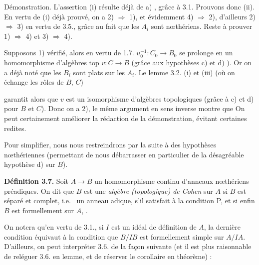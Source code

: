 \documentclass[11pt,a4paper]{article}
\begin{document}
Démonstration. L'assertion (i) résulte déjà de a) , grâce à 3.1. Prouvons donc
(ii). En vertu de (i) déjà prouvé, on a 2) $\Rightarrow$ 1), et évidemment
4) $\Rightarrow$ 2), d'ailleurs 2) $\Rightarrow$ 3) en vertu de 3.5., grâce
au fait que les $A_i$ sont nœthériens. Reste à prouver 1) $\Rightarrow$ 4) et
3) $\Rightarrow$ 4).

Supposons 1) vérifié, alors en vertu de 1.7. $u_0^{-1} : C_0 \to B_0$ se
prolonge en un homomorphisme d'algèbres top $v : C \to B$ (grâce aux
hypothèses c) et d) ). Or on a déjà noté que les $B_i$ sont plats sur les
$A_i$. Le lemme 3.2. (i) et (iii) (où on échange les rôles de $B$, $C$)


garantit alors que $v$ est un isomorphisme d'algèbres topologiques (grâce à c)
et d) pour $B$ et $C$). Donc  on a 2), 
 le même argument en sens inverse montre que 
On peut certainement améliorer la rédaction de la démonstration, évitant
certaines redites.

Pour simplifier, nous nous restreindrons par la suite à des hypothèses
nœthériennes (permettant de nous débarrasser en particulier de la désagréable
hypothèse d) sur $B$).

\textbf{Définition 3.7.} Soit $A \to B$ un homomorphisme continu d'anneaux
nœthériens préadiques. On dit que $B$ est une \emph{algèbre (topologique) de
Cohen} sur $A$ si  $B$ est séparé et complet, i.e.\  un
anneau adique, \struck{\ill{}}  s'il satisfait à la condition P, et
si enfin  $B$ est formellement \struck{\ill{}}  sur $A$,
.

On notera qu'en vertu de 3.1., si $I$ est un idéal de définition de $A$, la
dernière condition équivaut à la condition que $B/IB$ est formellement simple
sur $A/IA$. D'ailleurs, on peut interpréter 3.6. de la façon suivante (et il
est  plus raisonnable de reléguer 3.6. en lemme, et de réserver
le corollaire en théorème) :
\end{document}

